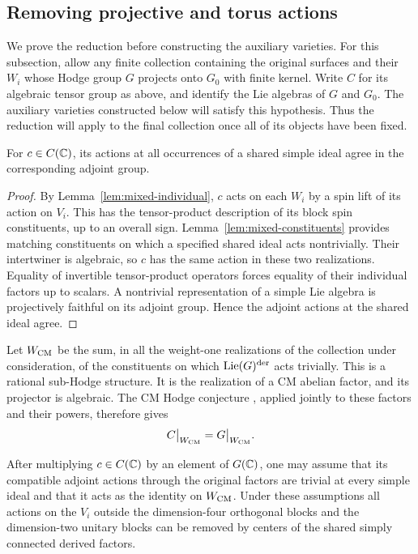 \subsection{Removing projective and torus actions}

We prove the reduction before constructing the auxiliary varieties.
For this subsection, allow any finite collection containing the original
surfaces and their $W_i$ whose Hodge group $G$ projects onto $G_0$ with
finite kernel.  Write $C$ for its algebraic tensor group as above, and
identify the Lie algebras of $G$ and $G_0$.  The auxiliary varieties
constructed below will satisfy this hypothesis.  Thus the reduction
will apply to the final collection once all of its objects have been
fixed.

\begin{lemma}\label{lem:mixed-projective}
For $c\in C(\mathbb C)$, its actions at all occurrences of a shared simple
ideal agree in the corresponding adjoint group.
\end{lemma}

\begin{proof}
By Lemma~\ref{lem:mixed-individual}, $c$ acts on each $W_i$ by a
spin lift of its action on $V_i$.  This has the tensor-product
description of its block spin constituents, up to an overall sign.
Lemma~\ref{lem:mixed-constituents} provides matching constituents
on which a specified shared ideal acts nontrivially.  Their
intertwiner is algebraic, so $c$ has the same action in these two
realizations.  Equality of invertible tensor-product operators
forces equality of their individual factors up to scalars.  A
nontrivial representation of a simple Lie algebra is projectively
faithful on its adjoint group.  Hence the adjoint actions at the
shared ideal agree.
\end{proof}

Let $W_{\rm CM}$ be the sum, in all the weight-one realizations of
the collection under consideration, of the constituents on which
$\operatorname{Lie}(G)^{\rm der}$ acts trivially.  This is a
rational sub-Hodge structure.  It is the realization of a CM abelian
factor, and its projector is algebraic.  The CM Hodge conjecture
\cite[Theorem~1.1]{CM}, applied jointly to these factors and their
powers, therefore gives
\begin{equation}\label{eq:mixed-cm-image}
 C\big|_{W_{\rm CM}}=G\big|_{W_{\rm CM}}.
\end{equation}

\begin{lemma}\label{lem:mixed-central}
After multiplying $c\in C(\mathbb C)$ by an element of $G(\mathbb C)$, one may
assume that its compatible adjoint actions through the original
factors are trivial at every simple ideal and that it acts as the
identity on $W_{\rm CM}$.  Under these assumptions all
actions on the $V_i$ outside the dimension-four orthogonal blocks
and the dimension-two unitary blocks can be removed by centers of
the shared simply connected derived factors.
\end{lemma}

